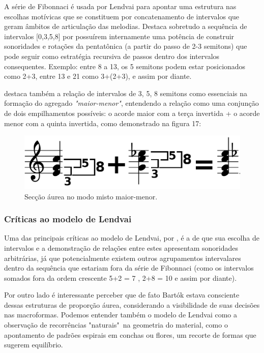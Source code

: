 \documentclass[
	12pt,				%
	openright,			%
	twoside,			%
	a4paper,			%
	english,			%
	french,				%
	spanish,			%
	brazil				%
	]{abntex2}
\begin{document}
A série de Fibonnaci é usada por Lendvai para apontar uma estrutura nas escolhas motívicas que se constituem por concatenamento de intervalos que geram âmbitos de articulação das melodias. Destaca sobretudo a sequência de intervalos [0,3,5,8] por possuírem internamente uma potência de construir sonoridades e rotações da pentatônica (a partir do passo de 2-3 semitons) que pode seguir como estratégia recursiva de passos dentro dos intervalos consequentes. Exemplo: entre 8 a 13, os 5 semitons podem estar posicionados como 2+3, entre 13 e 21 como 3+(2+3), e assim por diante.

 destaca também a relação de intervalos de 3, 5, 8 semitons como essenciais na formação do agregado \textit{"maior-menor"}, entendendo a relação como uma conjunção de dois empilhamentos possíveis: o acorde maior com a terça invertida + o acorde menor com a quinta invertida, como demonstrado na figura 17:

\begin{figure}[!h]
	\caption{\label{fig_grafico}Secção áurea no modo misto maior-menor.  }
	\begin{center}
	    \includegraphics[scale=0.3]{axis/GS_maior_menor.png}
	\end{center}
\end{figure} 



\subsubsection{Críticas ao modelo de Lendvai}

Uma das principais críticas ao modelo de Lendvai, por , é a de que sua escolha de intervalos e a demonstração de relações entre estes apresentam sonoridades arbitrárias, já que potencialmente existem outros agrupamentos intervalares dentro da sequência que estariam fora da série de Fibonnaci (como os intervalos somados fora da ordem crescente 5+2 = 7 , 2+8 = 10 e assim por diante).

Por outro lado é interessante perceber que de fato Bartók estava consciente dessas estruturas de proporção áurea, considerando a visibilidade de suas decisões nas macroformas. Podemos entender também o modelo de Lendvai como a observação de recorrências "naturais"\ na geometria do material, como o apontamento de padrões espirais em conchas ou flores, um recorte de formas que sugerem equilíbrio.
\end{document}
